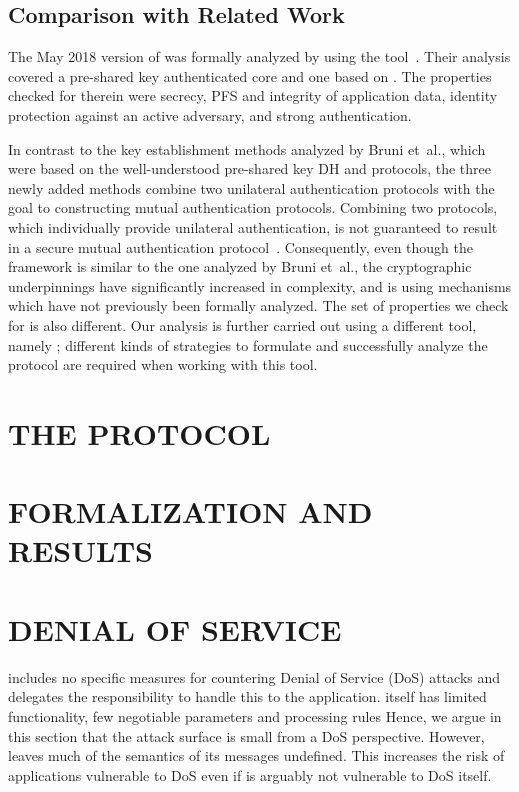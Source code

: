 \documentclass[runningheads]{llncs}
\begin{document}
\subsection{Comparison with Related Work}
The May 2018 version of \mEdhoc{} was formally analyzed by
\cite{DBLP:conf/secsr/BruniJPS18} using the \mProverif{}
tool~\cite{DBLP:conf/csfw/Blanchet01}.
%
Their analysis covered a pre-shared key authenticated core and one
based on \mSigma.
%
The properties checked for therein were secrecy, PFS and integrity of
application data, identity protection against an active adversary,
and strong authentication.
%

In contrast to the key establishment methods analyzed by Bruni et~al., which
were based on the well-understood pre-shared key DH and \mSigma{} protocols,
the three newly added
methods combine two unilateral authentication protocols with the goal to
constructing mutual authentication protocols.
%
Combining two protocols, which individually provide unilateral authentication,
is not guaranteed to result in a secure mutual authentication
protocol~\cite{DBLP:conf/ccs/Krawczyk16}.
%
Consequently, even though the framework is similar to the one analyzed by Bruni
et~al., the cryptographic underpinnings have significantly increased in
complexity, and is using mechanisms which have not previously been formally analyzed.
%
The set of properties we check for is also different.
%
Our analysis is further carried out using a different tool,
namely \mTamarin; different kinds of strategies to formulate and
successfully analyze the protocol are required when working with this tool.
%

\section{\uppercase{The \mEdhoc{} Protocol}}
\label{sec:edhoc}


\section{\uppercase{Formalization and Results}}
\label{sec:formalization}


\section{\uppercase{Denial of Service}}
\label{sec:dos}
\mEdhoc{} includes no specific measures for countering Denial of Service (DoS)
attacks and delegates the responsibility to handle this to the application.
%
\mEdhoc{} itself has limited functionality, few negotiable parameters and
processing rules
%
Hence, we argue in this section that the attack surface
is small from a DoS perspective.
%
However, \mEdhoc{} leaves much of the semantics of its messages undefined.
%
This increases the risk of applications vulnerable to DoS even if \mEdhoc{} is
arguably not vulnerable to DoS itself.
%
\end{document}
